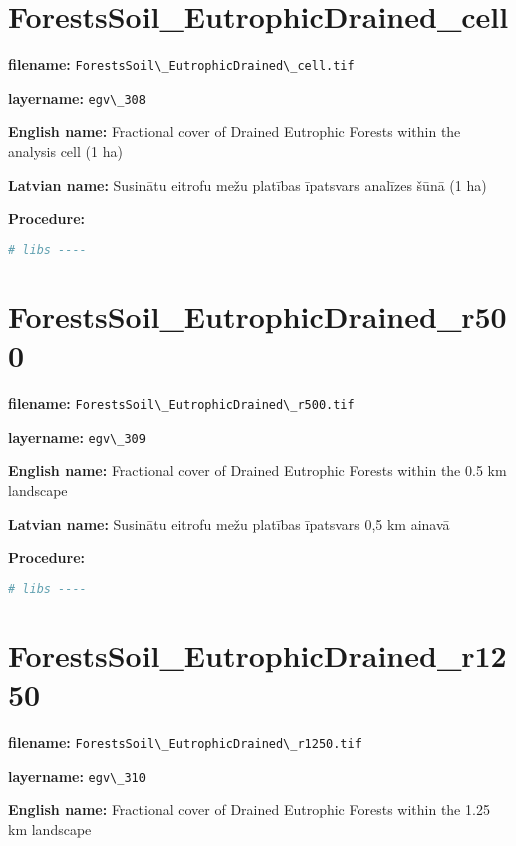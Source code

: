 \documentclass[
]{book}
\newcommand{\passthrough}[1]{#1}
\begin{document}
\section{ForestsSoil\_EutrophicDrained\_cell}\label{ch06.308}

\textbf{filename:} \passthrough{\lstinline!ForestsSoil\_EutrophicDrained\_cell.tif!}

\textbf{layername:} \passthrough{\lstinline!egv\_308!}

\textbf{English name:} Fractional cover of Drained Eutrophic Forests within the analysis cell (1 ha)

\textbf{Latvian name:} Susinātu eitrofu mežu platības īpatsvars analīzes šūnā (1 ha)

\textbf{Procedure:}

\begin{lstlisting}[language=R]
# libs ----
\end{lstlisting}

\section{ForestsSoil\_EutrophicDrained\_r500}\label{ch06.309}

\textbf{filename:} \passthrough{\lstinline!ForestsSoil\_EutrophicDrained\_r500.tif!}

\textbf{layername:} \passthrough{\lstinline!egv\_309!}

\textbf{English name:} Fractional cover of Drained Eutrophic Forests within the 0.5 km landscape

\textbf{Latvian name:} Susinātu eitrofu mežu platības īpatsvars 0,5 km ainavā

\textbf{Procedure:}

\begin{lstlisting}[language=R]
# libs ----
\end{lstlisting}

\section{ForestsSoil\_EutrophicDrained\_r1250}\label{ch06.310}

\textbf{filename:} \passthrough{\lstinline!ForestsSoil\_EutrophicDrained\_r1250.tif!}

\textbf{layername:} \passthrough{\lstinline!egv\_310!}

\textbf{English name:} Fractional cover of Drained Eutrophic Forests within the 1.25 km landscape
\end{document}
